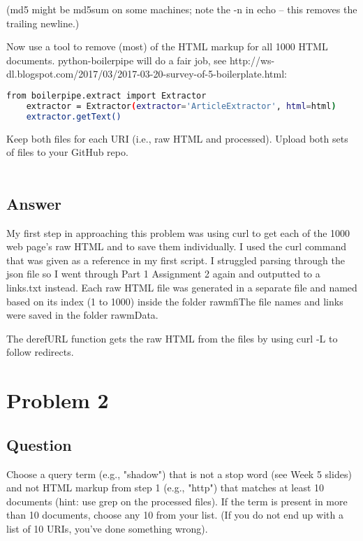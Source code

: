 \documentclass[letterpaper,12pt]{article}
\begin{document}
(md5 might be md5sum on some machines; note the -n in echo -- this removes the trailing newline.)

Now use a tool to remove (most) of the HTML markup for all 1000 HTML documents. python-boilerpipe will do a fair job, see http://ws-dl.blogspot.com/2017/03/2017-03-20-survey-of-5-boilerplate.html:

\begin{lstlisting}[language=bash,label=Command:, breakatwhitespace=〈false), caption=Command:]
from boilerpipe.extract import Extractor
	extractor = Extractor(extractor='ArticleExtractor', html=html)
	extractor.getText()
\end{lstlisting}

Keep both files for each URI (i.e., raw HTML and processed). Upload both sets of files to your GitHub repo.\\
\\

\subsection{Answer}
\vspace{2mm}
My first step in approaching this problem was using curl to get each of the 1000 web page's raw HTML and to save them individually. I used the curl command that was given as a reference in my first script. I struggled parsing through the json file so I went through Part 1 Assignment 2 again and outputted to a links.txt instead. Each raw HTML file was generated in a separate file and named based on its index (1 to 1000) inside the folder rawmfiThe file names and links were saved in the folder rawmData.
\vspace{2mm}



\vspace{1mm}

The derefURL function gets the raw HTML from the files by using curl -L to follow redirects. 
\vspace{2mm}

        
\section{Problem 2}

\subsection{Question}
\vspace*{10pt}
Choose a query term (e.g., "shadow") that is not a stop word (see Week 5 slides) and not HTML markup from step 1 (e.g., "http") that matches at least 10 documents (hint: use grep on the processed files). If the term is present in more than 10 documents, choose any 10 from your list. (If you do not end up with a list of 10 URIs, you've done something wrong).
\end{document}
